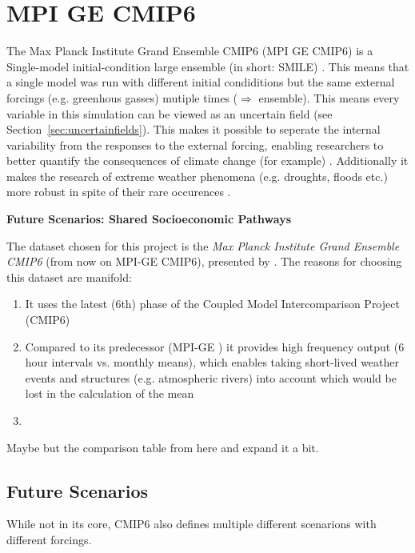 \chapter{MPI GE CMIP6}
\label{ch:dataset}

The Max Planck Institute Grand Ensemble CMIP6 (MPI GE CMIP6) is a Single-model initial-condition large ensemble (in short: SMILE) \cite{olonscheck_new_2023}. 
This means that a single model was run with different initial condiditions but the same external forcings (e.g. greenhous gasses) mutiple times ($\Rightarrow$ ensemble). 
This means every variable in this simulation can be viewed as an uncertain field (see Section~\ref{sec:uncertainfields}).
This makes it possible to seperate the internal variability from the responses to the external forcing, enabling researchers to better quantify the consequences of climate change (for example) . 
Additionally it makes the research of extreme weather phenomena (e.g. droughts, floods etc.) more robust in spite of their rare occurences \cite{maher_large_2021}. 


\textbf{Future Scenarios: Shared Socioeconomic Pathways}






The dataset chosen for this project is the \textit{Max Planck Institute Grand Ensemble CMIP6} (from now on MPI-GE CMIP6), presented by \citeauthor{olonscheck_new_2023} \cite{olonscheck_new_2023}. 
The reasons for choosing this dataset are manifold:

\begin{enumerate}
  \item It uses the latest (6th) phase of the Coupled Model Intercomparison Project (CMIP6)
  \item Compared to its predecessor (MPI-GE \cite{maher_max_2019}) it provides high frequency output (6 hour intervals vs. monthly means), which enables taking short-lived weather events and structures (e.g. atmospheric rivers) into account which would be lost in the calculation of the mean
  \item 
\end{enumerate}



Maybe but the comparison table from \cite{olonscheck_new_2023} here and expand it a bit. 

\section{Future Scenarios}

While not in its core, CMIP6 also defines multiple different scenarions with different forcings. 

